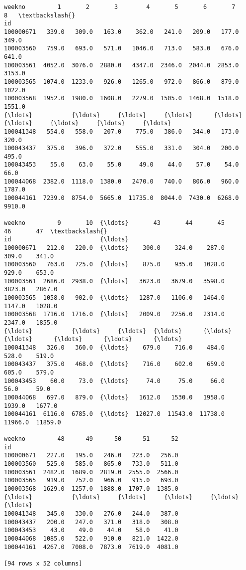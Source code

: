 \documentclass[11pt]{article}
\makeatletter
\newcommand{\boxspacing}{\kern\kvtcb@left@rule\kern\kvtcb@boxsep}
\newcommand{\prompt}[4]{
        {\ttfamily\llap{{\color{#2}[#3]:\hspace{3pt}#4}}\vspace{-\baselineskip}}
    }
\makeatother
\begin{document}
            \begin{tcolorbox}[breakable, size=fbox, boxrule=.5pt, pad at break*=1mm, opacityfill=0]
\prompt{Out}{outcolor}{13}{\boxspacing}
\begin{Verbatim}[commandchars=\\\{\}]
weekno         1       2       3        4       5       6       7       8   \textbackslash{}
id
100000671   339.0   309.0   163.0    362.0   241.0   209.0   177.0   349.0
100003560   759.0   693.0   571.0   1046.0   713.0   583.0   676.0   641.0
100003561  4052.0  3076.0  2880.0   4347.0  2346.0  2044.0  2853.0  3153.0
100003565  1074.0  1233.0   926.0   1265.0   972.0   866.0   879.0  1022.0
100003568  1952.0  1980.0  1608.0   2279.0  1505.0  1468.0  1518.0  1551.0
{\ldots}           {\ldots}     {\ldots}     {\ldots}      {\ldots}     {\ldots}     {\ldots}     {\ldots}     {\ldots}
100041348   554.0   558.0   207.0    775.0   386.0   344.0   173.0   320.0
100043437   375.0   396.0   372.0    555.0   331.0   304.0   200.0   495.0
100043453    55.0    63.0    55.0     49.0    44.0    57.0    54.0    66.0
100044068  2382.0  1118.0  1380.0   2470.0   740.0   806.0   960.0  1787.0
100044161  7239.0  8754.0  5665.0  11735.0  8044.0  7430.0  6268.0  9910.0

weekno         9       10  {\ldots}       43       44       45       46       47  \textbackslash{}
id                         {\ldots}
100000671   212.0   220.0  {\ldots}    300.0    324.0    287.0    309.0    341.0
100003560   763.0   725.0  {\ldots}    875.0    935.0   1028.0    929.0    653.0
100003561  2686.0  2938.0  {\ldots}   3623.0   3679.0   3598.0   3823.0   2867.0
100003565  1058.0   902.0  {\ldots}   1287.0   1106.0   1464.0   1147.0   1028.0
100003568  1716.0  1716.0  {\ldots}   2009.0   2256.0   2314.0   2347.0   1855.0
{\ldots}           {\ldots}     {\ldots}  {\ldots}      {\ldots}      {\ldots}      {\ldots}      {\ldots}      {\ldots}
100041348   326.0   360.0  {\ldots}    679.0    716.0    484.0    528.0    519.0
100043437   375.0   468.0  {\ldots}    716.0    602.0    659.0    605.0    579.0
100043453    60.0    73.0  {\ldots}     74.0     75.0     66.0     56.0     59.0
100044068   697.0   879.0  {\ldots}   1612.0   1530.0   1958.0   1939.0   1677.0
100044161  6116.0  6785.0  {\ldots}  12027.0  11543.0  11738.0  11966.0  11859.0

weekno         48      49      50      51      52
id
100000671   227.0   195.0   246.0   223.0   256.0
100003560   525.0   585.0   865.0   733.0   511.0
100003561  2482.0  1689.0  2819.0  2555.0  2566.0
100003565   919.0   752.0   966.0   915.0   693.0
100003568  1629.0  1257.0  1888.0  1707.0  1385.0
{\ldots}           {\ldots}     {\ldots}     {\ldots}     {\ldots}     {\ldots}
100041348   345.0   330.0   276.0   244.0   387.0
100043437   200.0   247.0   371.0   318.0   308.0
100043453    43.0    49.0    44.0    58.0    41.0
100044068  1085.0   522.0   910.0   821.0  1422.0
100044161  4267.0  7008.0  7873.0  7619.0  4081.0

[94 rows x 52 columns]
\end{Verbatim}
\end{tcolorbox}
        
\end{document}
